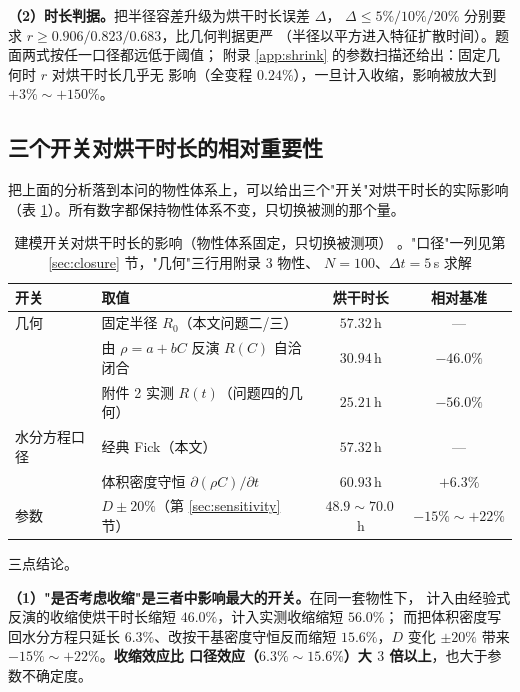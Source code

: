 \documentclass[12pt,a4paper,fontset=none]{ctexart}
\begin{document}
\textbf{（2）时长判据。}把半径容差升级为烘干时长误差 $\Delta$，
$\Delta\le5\%/10\%/20\%$ 分别要求 $r\ge0.906/0.823/0.683$，比几何判据更严
（半径以平方进入特征扩散时间）。题面两式按任一口径都远低于阈值；
附录 \ref{app:shrink} 的参数扫描还给出：固定几何时 $r$ 对烘干时长几乎无
影响（全变程 $0.24\%$），一旦计入收缩，影响被放大到 $+3\%\sim+150\%$。

\subsection{三个开关对烘干时长的相对重要性}

把上面的分析落到本问的物性体系上，可以给出三个"开关"对烘干时长的实际影响
（表 \ref{tab:p11-geom}）。所有数字都保持物性体系不变，只切换被测的那个量。

\begin{table}[htbp]
  \centering
  \caption{建模开关对烘干时长的影响（物性体系固定，只切换被测项）
    。"口径"一列见第 \ref{sec:closure} 节，"几何"三行用附录 3 物性、
    $N=100$、$\Delta t=5$\,s 求解}
  \label{tab:p11-geom}
  \small
  \begin{tabular}{llcc}
    \toprule
    开关 & 取值 & 烘干时长 & 相对基准 \\
    \midrule
    几何 & 固定半径 $R_0$（本文问题二/三） & $57.32$\,h & --- \\
         & 由 $\rho=a+bC$ 反演 $R(C)$ 自洽闭合 & $30.94$\,h & $-46.0\%$ \\
         & 附件 2 实测 $R(t)$（问题四的几何） & $25.21$\,h & $-56.0\%$ \\
    \midrule
    水分方程口径 & 经典 Fick（本文） & $57.32$\,h & --- \\
                 & 体积密度守恒 $\partial(\rho C)/\partial t$ & $60.93$\,h
      & $+6.3\%$ \\
    \midrule
    参数 & $D\pm20\%$（第 \ref{sec:sensitivity} 节） & $48.9\sim70.0$\,h
      & $-15\%\sim+22\%$ \\
    \bottomrule
  \end{tabular}
\end{table}

三点结论。

\textbf{（1）"是否考虑收缩"是三者中影响最大的开关。}在同一套物性下，
计入由经验式反演的收缩使烘干时长缩短 $46.0\%$，计入实测收缩缩短 $56.0\%$；
而把体积密度写回水分方程只延长 $6.3\%$、改按干基密度守恒反而缩短
$15.6\%$，$D$ 变化 $\pm20\%$ 带来 $-15\%\sim+22\%$。\textbf{收缩效应比
口径效应（$6.3\%\sim15.6\%$）大 $3$ 倍以上}，也大于参数不确定度。
\end{document}
